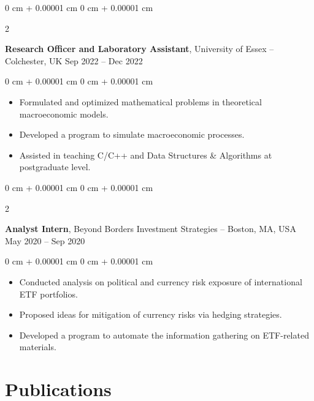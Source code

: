 \documentclass[10pt, letterpaper]{article}
\newenvironment{highlights}{
    \begin{itemize}[
        topsep=0.10 cm,
        parsep=0.10 cm,
        partopsep=0pt,
        itemsep=0pt,
        leftmargin=0 cm + 10pt
    ]
}{
    \end{itemize}
} %
\newenvironment{onecolentry}{
    \begin{adjustwidth}{
        0 cm + 0.00001 cm
    }{
        0 cm + 0.00001 cm
    }
}{
    \end{adjustwidth}
} %
\newenvironment{twocolentry}[2][]{
    \onecolentry
    \def\secondColumn{#2}
    \setcolumnwidth{\fill, 4.5 cm}
    \begin{paracol}{2}
}{
    \switchcolumn \raggedleft \secondColumn
    \end{paracol}
    \endonecolentry
} %
\begin{document}
        \begin{twocolentry}{
            Sep 2022 – Dec 2022
        }
            \textbf{Research Officer and Laboratory Assistant}, University of Essex -- Colchester, UK\end{twocolentry}

        \vspace{0.10 cm}
        \begin{onecolentry}
            \begin{highlights}
                  \item Formulated and optimized mathematical problems in theoretical macroeconomic models.
                  \item Developed a program to simulate macroeconomic processes.
                  \item Assisted in teaching C/C++ and Data Structures \& Algorithms at postgraduate level.
            \end{highlights}
        \end{onecolentry}
    
        \vspace{0.2 cm}

        \begin{twocolentry}{
            May 2020 – Sep 2020
        }
            \textbf{Analyst Intern}, Beyond Borders Investment Strategies -- Boston, MA, USA\end{twocolentry}

        \vspace{0.10 cm}
        \begin{onecolentry}
            \begin{highlights}
              \item Conducted analysis on political and currency risk exposure of international ETF portfolios.
              \item Proposed ideas for mitigation of currency risks via hedging strategies.
              \item Developed a program to automate the information gathering on ETF-related materials.
            \end{highlights}
        \end{onecolentry}
    \section{Publications}
\end{document}
